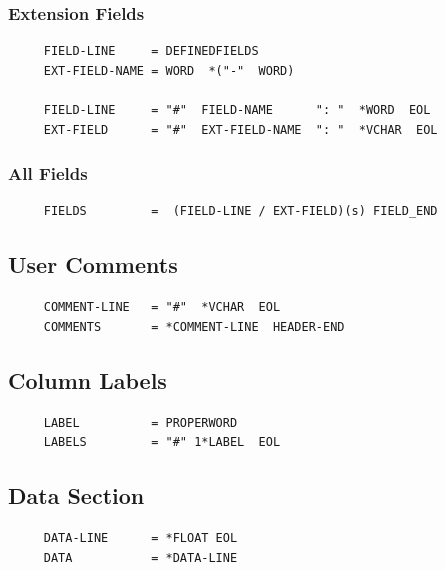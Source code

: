 \documentclass{article}
\begin{document}
\subsubsection{Extension Fields}
\label{apdx:gram_hdr_extension}
\begin{verbatim}
     FIELD-LINE     = DEFINEDFIELDS
     EXT-FIELD-NAME = WORD  *("-"  WORD)

     FIELD-LINE     = "#"  FIELD-NAME      ": "  *WORD  EOL
     EXT-FIELD      = "#"  EXT-FIELD-NAME  ": "  *VCHAR  EOL
\end{verbatim}

\subsubsection{All Fields}
\label{apdx:gram_fields}
\begin{verbatim}
     FIELDS         =  (FIELD-LINE / EXT-FIELD)(s) FIELD_END
\end{verbatim}


\subsection{User Comments}
\label{apdx:gram_comments}
\begin{verbatim}
     COMMENT-LINE   = "#"  *VCHAR  EOL
     COMMENTS       = *COMMENT-LINE  HEADER-END
\end{verbatim}

\subsection{Column Labels}
\label{apdx:gram_labels}
\begin{verbatim}
     LABEL          = PROPERWORD
     LABELS         = "#" 1*LABEL  EOL
\end{verbatim}

\subsection{Data Section}
\label{apdx:gram_data}
\begin{verbatim}
     DATA-LINE      = *FLOAT EOL
     DATA           = *DATA-LINE
\end{verbatim}
\end{document}
